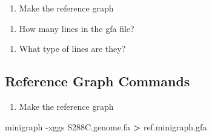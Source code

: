\documentclass[
]{book}
\newenvironment{Shaded}{\begin{snugshade}}{\end{snugshade}}
\newcommand{\AttributeTok}[1]{\textcolor[rgb]{0.77,0.63,0.00}{#1}}
\newcommand{\ExtensionTok}[1]{#1}
\newcommand{\NormalTok}[1]{#1}
\newcommand{\OperatorTok}[1]{\textcolor[rgb]{0.81,0.36,0.00}{\textbf{#1}}}
\providecommand{\tightlist}{%
  \setlength{\itemsep}{0pt}\setlength{\parskip}{0pt}}
\begin{document}
\begin{enumerate}
\def\labelenumi{\arabic{enumi}.}
\tightlist
\item
  Make the reference graph
\end{enumerate}

\begin{Shaded}
\begin{Highlighting}[]

\end{Highlighting}
\end{Shaded}

\begin{enumerate}
\def\labelenumi{\arabic{enumi}.}
\setcounter{enumi}{1}
\tightlist
\item
  How many lines in the gfa file?
\end{enumerate}

\begin{Shaded}
\begin{Highlighting}[]

\end{Highlighting}
\end{Shaded}

\begin{enumerate}
\def\labelenumi{\arabic{enumi}.}
\setcounter{enumi}{2}
\tightlist
\item
  What type of lines are they?
\end{enumerate}

\begin{Shaded}
\begin{Highlighting}[]

\end{Highlighting}
\end{Shaded}

\hypertarget{reference-graph-commands}{%
\subsection*{Reference Graph Commands}\label{reference-graph-commands}}

\begin{enumerate}
\def\labelenumi{\arabic{enumi}.}
\tightlist
\item
  Make the reference graph
\end{enumerate}

\begin{Shaded}
\begin{Highlighting}[]
\ExtensionTok{minigraph} \AttributeTok{{-}xggs}\NormalTok{ S288C.genome.fa }\OperatorTok{\textgreater{}}\NormalTok{ ref.minigraph.gfa}
\end{Highlighting}
\end{Shaded}
\end{document}
